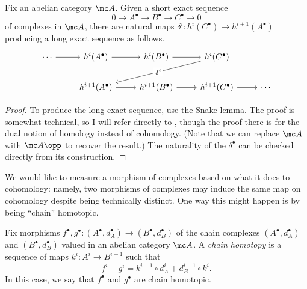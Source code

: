 \documentclass[../notes.tex]{subfiles}
\begin{document}
\begin{proposition} \label{prop:get-les-complex}
	Fix an abelian category $\mc A$. Given a short exact sequence
	\[0\to A^\bullet\to B^\bullet\to C^\bullet\to0\]
	of complexes in $\mc A$, there are natural maps $\delta^i\colon h^i(C^\bullet)\to h^{i+1}(A^\bullet)$ producing a long exact sequence as follows.
	\[\begin{tikzcd}
		\cdots & {h^i(A^\bullet)} & {h^i(B^\bullet)} & {h^i(C^\bullet)} \\
		& {h^{i+1}(A^\bullet)} & {h^{i+1}(B^\bullet)} & {h^{i+1}(C^\bullet)} & \cdots
		\arrow[from=1-1, to=1-2]
		\arrow[from=1-2, to=1-3]
		\arrow[from=1-3, to=1-4]
		\arrow["{\delta^i}"{description}, from=1-4, to=2-2]
		\arrow[from=2-2, to=2-3]
		\arrow[from=2-3, to=2-4]
		\arrow[from=2-4, to=2-5]
	\end{tikzcd}\]
\end{proposition}
\begin{proof}
	To produce the long exact sequence, use the Snake lemma. The proof is somewhat technical, so I will refer directly to \cite[Theorem~4.82]{elber-ca}, though the proof there is for the dual notion of homology instead of cohomology. (Note that we can replace $\mc A$ with $\mc A\opp$ to recover the result.) The naturality of the $\delta^\bullet$ can be checked directly from its construction.
\end{proof}
We would like to measure a morphism of complexes based on what it does to cohomology: namely, two morphisms of complexes may induce the same map on cohomology despite being technically distinct. One way this might happen is by being ``chain'' homotopic.
\begin{definition}
	Fix morphisms $f^\bullet,g^\bullet\colon(A^\bullet,d_A^\bullet)\to(B^\bullet,d_B^\bullet)$ of the chain complexes $(A^\bullet,d_A^\bullet)$ and $(B^\bullet,d_B^\bullet)$ valued in an abelian category $\mc A$. A \textit{chain homotopy} is a sequence of maps $k^i\colon A^i\to B^{i-1}$ such that
	\[f^i-g^i=k^{i+1}\circ d_A^i+d_B^{i-1}\circ k^i.\]
	In this case, we say that $f^\bullet$ and $g^\bullet$ are chain homotopic.
\end{definition}
\end{document}
